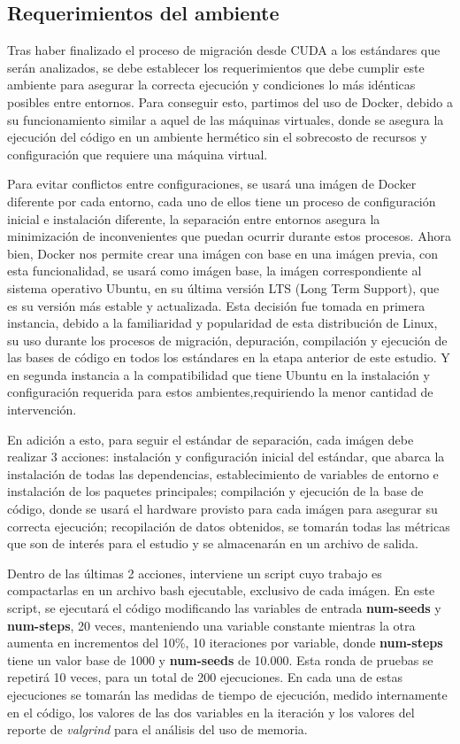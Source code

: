 \subsection{Requerimientos del ambiente}

Tras haber finalizado el proceso de migración desde CUDA a los estándares que serán analizados, se debe establecer los requerimientos que debe cumplir este ambiente para asegurar la correcta ejecución y condiciones lo más idénticas posibles entre entornos. Para conseguir esto, partimos del uso de Docker, debido a su funcionamiento similar a aquel de las máquinas virtuales, donde se asegura la ejecución del código en un ambiente hermético sin el sobrecosto de recursos y configuración que requiere una máquina virtual.

Para evitar conflictos entre configuraciones, se usará una imágen de Docker diferente por cada entorno, cada uno de ellos tiene un proceso de configuración inicial e instalación diferente, la separación entre entornos asegura la minimización de inconvenientes que puedan ocurrir durante estos procesos. Ahora bien, Docker nos permite crear una imágen con base en una imágen previa, con esta funcionalidad, se usará como imágen base, la imágen correspondiente al sistema operativo Ubuntu, en su última versión LTS (Long Term Support), que es su versión más estable y actualizada. Esta decisión fue tomada en primera instancia, debido a la familiaridad y popularidad de esta distribución de Linux, su uso durante los procesos de migración, depuración, compilación y ejecución de las bases de código en todos los estándares en la etapa anterior de este estudio. Y en segunda instancia a la compatibilidad que tiene Ubuntu en la instalación y configuración requerida para estos ambientes,requiriendo la menor cantidad de intervención.

En adición a esto, para seguir el estándar de separación, cada imágen debe realizar 3 acciones: instalación y configuración inicial del estándar, que abarca la instalación de todas las dependencias, establecimiento de variables de entorno e instalación de los paquetes principales; compilación y ejecución de la base de código, donde se usará el hardware provisto para cada imágen para asegurar su correcta ejecución; recopilación de datos obtenidos, se tomarán todas las métricas que son de interés para el estudio y se almacenarán en un archivo de salida.

Dentro de las últimas 2 acciones, interviene un script cuyo trabajo es compactarlas en un archivo bash ejecutable, exclusivo de cada imágen. En este script, se ejecutará el código modificando las variables de entrada \textbf{num-seeds} y \textbf{num-steps}, 20 veces, manteniendo una variable constante mientras la otra aumenta en incrementos del 10\%, 10 iteraciones por variable, donde \textbf{num-steps} tiene un valor base de 1000 y \textbf{num-seeds} de 10.000. Esta ronda de pruebas se repetirá 10 veces, para un total de 200 ejecuciones. En cada una de estas ejecuciones se tomarán las medidas de tiempo de ejecución, medido internamente en el código, los valores de las dos variables en la iteración y los valores del reporte de \textit{valgrind} para el análisis del uso de memoria.




